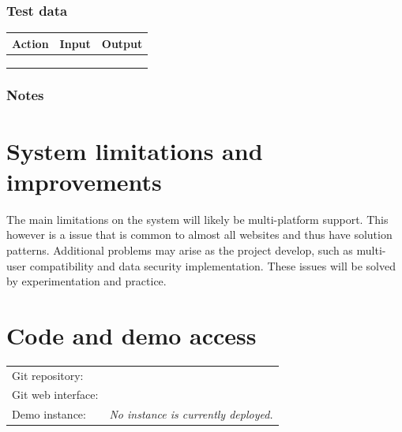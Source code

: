 \documentclass{article}
\begin{document}
\subsubsection*{Test data}
\begin{table}[h]
\centering
\begin{tabular}{lll}
\hline
\multicolumn{1}{|l|}{\textbf{Action}} & \multicolumn{1}{l|}{\textbf{Input}} & \multicolumn{1}{l|}{\textbf{Output}} \\ \hline
& & \\
& & \\
& &                      
\end{tabular}
\end{table}
\subsubsection*{Notes}
\hline

\newpage
\section{System limitations and improvements}
The main limitations on the system will likely be multi-platform support. This however is a issue that is common to almost all websites and thus have solution patterns. Additional problems may arise as the project develop, such as multi-user compatibility and data security implementation. These issues will be solved by experimentation and practice. 

\section{Code and demo access}
\begin{table}[H]
\centering
\begin{tabular}{ll}
Git repository: & \href{git://github.com/willeponken/picoshop.git} \\
Git web interface: & \href{https://github.com/willeponken/picoshop} \\
Demo instance: & \textit{No instance is currently deployed.}
\end{tabular}
\end{table}
\end{document}
